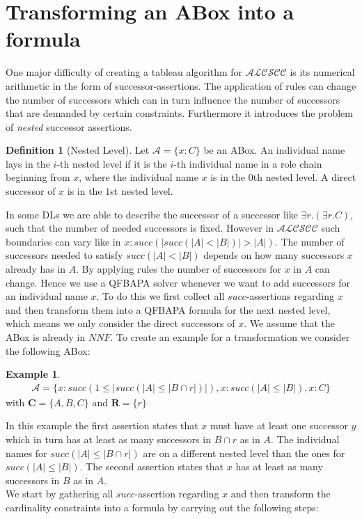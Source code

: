 \documentclass{book}
\theoremstyle{break}
\theoremstyle{definition}
\newtheorem{mydef}{Definition}
\newtheorem{ex}{Example}
\begin{document}
\section{Transforming an ABox into a formula}\label{transform}
One major difficulty of creating a tableau algorithm for $\mathcal{ALCSCC}$ is its numerical arithmetic in the form of successor-assertions. The application of rules can change the number of successors which can in turn influence the number of successors that are demanded by certain constraints. Furthermore it introduces the problem of \textit{nested} successor assertions.
\begin{mydef}[Nested Level]
Let $\mathcal{A}=\{x:C\}$ be an ABox. An individual name lays in the $i$-th nested level if it is the $i$-th individual name in a role chain beginning from $x$, where the individual name $x$ is in the $0$th nested level. A direct successor of $x$ is in the $1$st nested level. 
\end{mydef}
In some DLs we are able to describe the successor of a successor like $\exists r.(\exists r.C)$, such that the number of needed successors is fixed. However in $\mathcal{ALCSCC}$ such boundaries can vary like in $x:succ(|succ(|A|<|B|)|>|A|)$. The number of successors needed to satisfy $succ(|A|<|B|)$ depends on how many successors $x$ already has in $A$. By applying rules the number of successors for $x$ in $A$ can change. Hence we use a QFBAPA solver whenever we want to add successors for an individual name $x$. To do this we first collect all $succ$-assertions regarding $x$ and then transform them into a QFBAPA formula for the next nested level, which means we only consider the direct successors of $x$. We assume that the ABox is already in $NNF$. To create an example for a transformation we consider the following ABox:
\begin{ex}\label{ex1}
\begin{align*}
\mathcal{A}=\{x:succ(1\leq|succ(|A|\leq|B\cap r|)|), x:succ(|A|\leq |B|), x:C\}
\end{align*}
with $\mathbf{C}=\{A,B,C\}$ and $\mathbf{R}=\{r\}$
\end{ex}
In this example the first assertion states that $x$ must have at least one successor $y$ which in turn has at least as many successors in $B\cap r$ as in $A$. The individual names for $succ(|A|\leq|B\cap r|)$ are on a different nested level than the ones for $succ(|A|\leq |B|)$. The second assertion states that $x$ has at least as many successors in $B$ as in $A$.\\
We start by gathering all $succ$-assertion regarding $x$ and then transform the cardinality constraints into a formula by carrying out the following steps:
\end{document}
